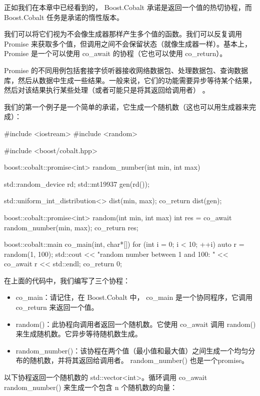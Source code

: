 正如我们在本章中已经看到的， Boost.Cobalt 承诺是返回一个值的热切协程，而 Boost.Cobalt 任务是承诺的惰性版本。

我们可以将它们视为不会像生成器那样产生多个值的函数。我们可以反复调用 Promise 来获取多个值，但调用之间不会保留状态（就像生成器一样）。基本上， Promise 是一个可以使用 co\_await 的协程（它也可以使用 co\_return）。

Promise 的不同用例包括套接字侦听器接收网络数据包、处理数据包、查询数据库，然后从数据中生成一些结果。一般来说，它们的功能需要异步等待某个结果，然后对该结果执行某些处理（或者可能只是将其返回给调用者） 。

我们的第一个例子是一个简单的承诺，它生成一个随机数（这也可以用生成器来完成）：

\begin{cpp}
#include <iostream>
#include <random>

#include <boost/cobalt.hpp>

boost::cobalt::promise<int> random_number(int min, int max) {
    std::random_device rd;
    std::mt19937 gen(rd());

    std::uniform_int_distribution<> dist(min, max);
    co_return dist(gen);
}

boost::cobalt::promise<int> random(int min, int max) {
    int res = co_await random_number(min, max);
    co_return res;
}

boost::cobalt::main co_main(int, char*[]) {
    for (int i = 0; i < 10; ++i) {
        auto r = random(1, 100);
        std::cout << "random number between 1 and 100: "
                  << co_await r << std::endl;
    }
    co_return 0;
}
\end{cpp}

在上面的代码中，我们编写了三个协程：

\begin{itemize}
\item
co\_main：请记住，在 Boost.Cobalt 中， co\_main 是一个协同程序，它调用 co\_return 来返回一个值。

\item
random()：此协程向调用者返回一个随机数。它使用 co\_await 调用 random() 来生成随机数。它异步等待随机数生成。

\item
random\_number()：该协程在两个值（最小值和最大值）之间生成一个均匀分布的随机数，并将其返回给调用者。 random\_number() 也是一个promise。
\end{itemize}

以下协程返回一个随机数的 std::vector<int>。循环调用 co\_await random\_number() 来生成一个包含 n 个随机数的向量：

